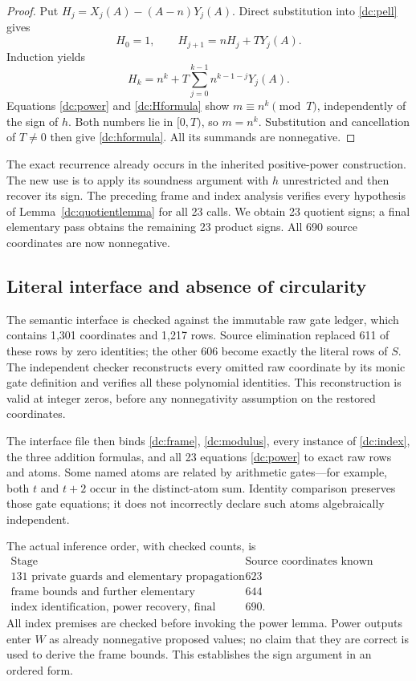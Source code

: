 \begin{proof}
Put $H_j=X_j(A)-(A-n)Y_j(A)$.  Direct substitution into
\eqref{dc:pell} gives
\[
 H_0=1,\qquad H_{j+1}=nH_j+TY_j(A).
\]
Induction yields
\begin{equation}\label{dc:Hformula}
 H_k=n^k+T\sum_{j=0}^{k-1}n^{k-1-j}Y_j(A).
\end{equation}
Equations \eqref{dc:power} and \eqref{dc:Hformula} show
$m\equiv n^k\pmod T$, independently of the sign of $h$.
Both numbers lie in $[0,T)$, so $m=n^k$.
Substitution and cancellation of $T\ne0$ then give
\eqref{dc:hformula}.  All its summands are nonnegative.
\end{proof}

The exact recurrence already occurs in the inherited positive-power
construction.  The new use is to apply its soundness argument with
$h$ unrestricted and then recover its sign.  The preceding frame and
index analysis verifies every hypothesis of Lemma~\ref{dc:quotientlemma}
for all 23 calls.  We obtain 23 quotient signs; a final elementary pass
obtains the remaining 23 product signs.  All 690 source coordinates
are now nonnegative.

\subsection{Literal interface and absence of circularity}

The semantic interface is checked against the immutable raw gate ledger,
which contains 1,301 coordinates and 1,217 rows.  Source elimination
replaced 611 of these rows by zero identities; the other 606 become
exactly the literal rows of $S$.  The independent checker reconstructs
every omitted raw coordinate by its monic gate definition and verifies
all these polynomial identities.  This reconstruction is valid at
integer zeros, before any nonnegativity assumption on the restored
coordinates.

The interface file then binds \eqref{dc:frame}, \eqref{dc:modulus},
every instance of \eqref{dc:index}, the three addition formulas, and all
23 equations \eqref{dc:power} to exact raw rows and atoms.  Some named
atoms are related by arithmetic gates---for example, both $t$ and
$t+2$ occur in the distinct-atom sum.  Identity comparison preserves
those gate equations; it does not incorrectly declare such atoms
algebraically independent.

The actual inference order, with checked counts, is
\[
\begin{array}{c|c}
\text{Stage}&\text{Source coordinates known nonnegative}\\\hline
131\text{ private guards and elementary propagation}&623\\
\text{frame bounds and further elementary propagation}&644\\
\text{index identification, power recovery, final propagation}&690.
\end{array}
\]
All index premises are checked before invoking the power lemma.
Power outputs enter $W$ as already nonnegative proposed values; no
claim that they are correct is used to derive the frame bounds.
This establishes the sign argument in an ordered form.

